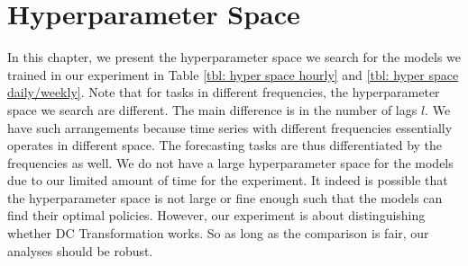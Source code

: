 \chapter{Hyperparameter Space}\label{apdx: hyper space}
In this chapter, we present the hyperparameter space we search for the models we trained in our experiment in Table \ref{tbl: hyper space hourly} and \ref{tbl: hyper space daily/weekly}. Note that for tasks in different frequencies, the hyperparameter space we search are different. The main difference is in the number of lags $l$. We have such arrangements because time series with different frequencies essentially operates in different space. The forecasting tasks are thus differentiated by the frequencies as well. We do not have a large hyperparameter space for the models due to our limited amount of time for the experiment. It indeed is possible that the hyperparameter space is not large or fine enough such that the models can find their optimal policies. However, our experiment is about distinguishing whether DC Transformation works. So as long as the comparison is fair, our analyses should be robust.
